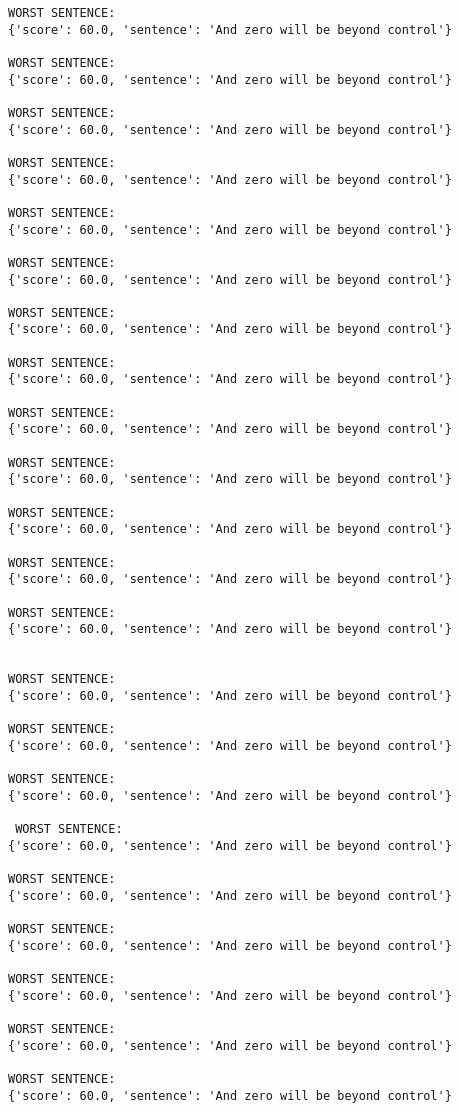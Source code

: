 \documentclass[12pt,a4paper,oneside]{book}
\begin{document}
\begin{verbatim}
WORST SENTENCE:
{'score': 60.0, 'sentence': 'And zero will be beyond control'}

WORST SENTENCE:
{'score': 60.0, 'sentence': 'And zero will be beyond control'}

WORST SENTENCE:
{'score': 60.0, 'sentence': 'And zero will be beyond control'}

WORST SENTENCE:
{'score': 60.0, 'sentence': 'And zero will be beyond control'}

WORST SENTENCE:
{'score': 60.0, 'sentence': 'And zero will be beyond control'}

WORST SENTENCE:
{'score': 60.0, 'sentence': 'And zero will be beyond control'}

WORST SENTENCE:
{'score': 60.0, 'sentence': 'And zero will be beyond control'}

WORST SENTENCE:
{'score': 60.0, 'sentence': 'And zero will be beyond control'}

WORST SENTENCE:
{'score': 60.0, 'sentence': 'And zero will be beyond control'}

WORST SENTENCE:
{'score': 60.0, 'sentence': 'And zero will be beyond control'}

WORST SENTENCE:
{'score': 60.0, 'sentence': 'And zero will be beyond control'}

WORST SENTENCE:
{'score': 60.0, 'sentence': 'And zero will be beyond control'}

WORST SENTENCE:
{'score': 60.0, 'sentence': 'And zero will be beyond control'}
 
 
WORST SENTENCE:
{'score': 60.0, 'sentence': 'And zero will be beyond control'}

WORST SENTENCE:
{'score': 60.0, 'sentence': 'And zero will be beyond control'}

WORST SENTENCE:
{'score': 60.0, 'sentence': 'And zero will be beyond control'}

 WORST SENTENCE:
{'score': 60.0, 'sentence': 'And zero will be beyond control'}

WORST SENTENCE:
{'score': 60.0, 'sentence': 'And zero will be beyond control'}

WORST SENTENCE:
{'score': 60.0, 'sentence': 'And zero will be beyond control'}

WORST SENTENCE:
{'score': 60.0, 'sentence': 'And zero will be beyond control'}

WORST SENTENCE:
{'score': 60.0, 'sentence': 'And zero will be beyond control'}

WORST SENTENCE:
{'score': 60.0, 'sentence': 'And zero will be beyond control'}


\end{verbatim}
\end{document}
